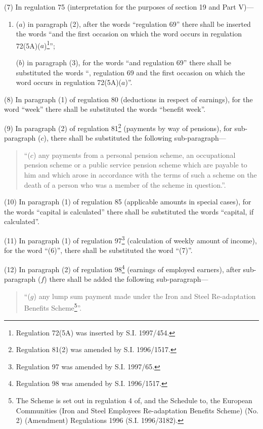 \documentclass[12pt,a4paper]{article}
\begin{document}
(7) In regulation 75 (interpretation for the purposes of section 19 and Part V)—
\begin{enumerate}\item[]
($a$) in paragraph (2), after the words “regulation 69” there shall be inserted the words “and the first occasion on which the word occurs in regulation 72(5A)($a$)\footnote{\frenchspacing Regulation 72(5A) was inserted by S.I. 1997/454.}”;

($b$) in paragraph (3), for the words “and regulation 69” there shall be substituted the words “, regulation 69 and the first occasion on which the word occurs in regulation 72(5A)($a$)”.
\end{enumerate}

(8) In paragraph (1) of regulation 80 (deductions in respect of earnings), for the word “week” there shall be substituted the words “benefit week”.

(9) In paragraph (2) of regulation 81\footnote{\frenchspacing Regulation 81(2) was amended by S.I. 1996/1517.} (payments by way of pensions), for sub-paragraph ($c$), there shall be substituted the following sub-paragraph—
\begin{quotation}
“($c$) any payments from a personal pension scheme, an occupational pension scheme or a public service pension scheme which are payable to him and which arose in accordance with the terms of such a scheme on the death of a person who was a member of the scheme in question.”.
\end{quotation}

(10) In paragraph (1) of regulation 85 (applicable amounts in special cases), for the words “capital is calculated” there shall be substituted the words “capital, if calculated”.

(11) In paragraph (1) of regulation 97\footnote{\frenchspacing Regulation 97 was amended by S.I. 1997/65.} (calculation of weekly amount of income), for the word “(6)”, there shall be substituted the word “(7)”.

(12) In paragraph (2) of regulation 98\footnote{\frenchspacing Regulation 98 was amended by S.I. 1996/1517.} (earnings of employed earners), after sub-paragraph ($f$)  there shall be added the following sub-paragraph—
\begin{quotation}
“($g$) any lump sum payment made under the Iron and Steel Re-adaptation Benefits Scheme\footnote{\frenchspacing The Scheme is set out in regulation 4 of, and the Schedule to, the European Communities (Iron and Steel Employees Re-adaptation Benefits Scheme) (No. 2) (Amendment) Regulations 1996 (S.I. 1996/3182).}”.
\end{quotation}
\end{document}
